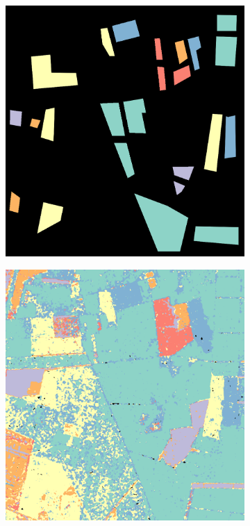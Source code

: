 \begin{figure}[t]
	\centering
	\begin{subfigure}[b]{0.23\textwidth}
		\includegraphics[width=\textwidth]{Figures/Kron/Review/GT}
		\caption{}
		\label{fig:Training}
	\end{subfigure}
	\begin{subfigure}[b]{0.23\textwidth}
		\includegraphics[width=\textwidth]{Figures/Kron/Review/CL_raw_COLOUR_PR_0_185_1000_1050_MASK}

\end{subfigure}
\end{figure}
